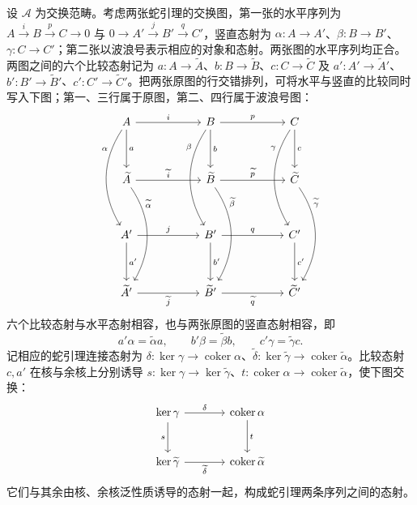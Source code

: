 \begin{proposition}\label{b4:prop:snake-naturality}
	设 \(\mathcal A\) 为交换范畴。考虑两张蛇引理的交换图，第一张的水平序列为 \(A\xrightarrow{i}B\xrightarrow{p}C\to0\) 与 \(0\to A'\xrightarrow{j}B'\xrightarrow{q}C'\)，竖直态射为 \(\alpha:A\to A'\)、\(\beta:B\to B'\)、\(\gamma:C\to C'\)；第二张以波浪号表示相应的对象和态射。两张图的水平序列均正合。两图之间的六个比较态射记为 \(a:A\to\widetilde A\)、\(b:B\to\widetilde B\)、\(c:C\to\widetilde C\) 及 \(a':A'\to\widetilde A'\)、\(b':B'\to\widetilde B'\)、\(c':C'\to\widetilde C'\)。把两张原图的行交错排列，可将水平与竖直的比较同时写入下图；第一、三行属于原图，第二、四行属于波浪号图：
	\[
		\begin{tikzcd}[column sep=5.5em,row sep=3.4em]
			A\arrow[r,"i"]\arrow[d,"a"]\arrow[dd,bend right=32,"\alpha"',pos=0.25]& B\arrow[r,"p"]\arrow[d,"b"]\arrow[dd,bend right=32,"\beta"',pos=0.25]& C\arrow[d,"c"]\arrow[dd,bend right=32,"\gamma"',pos=0.25]\\
			\widetilde A\arrow[r,"\widetilde i"]\arrow[dd,bend left=32,"\widetilde\alpha",pos=0.25]& \widetilde B\arrow[r,"\widetilde p"]\arrow[dd,bend left=32,"\widetilde\beta",pos=0.25]& \widetilde C\arrow[dd,bend left=32,"\widetilde\gamma",pos=0.25]\\
			A'\arrow[r,"j"]\arrow[d,"a'"]&B'\arrow[r,"q"]\arrow[d,"b'"]&C'\arrow[d,"c'"]\\
			\widetilde A'\arrow[r,"\widetilde j"']&\widetilde B'\arrow[r,"\widetilde q"']&\widetilde C'
		\end{tikzcd}
	\]
	六个比较态射与水平态射相容，也与两张原图的竖直态射相容，即
	\[
		a'\alpha=\widetilde\alpha a,\qquad b'\beta=\widetilde\beta b,\qquad c'\gamma=\widetilde\gamma c.
	\]
	记相应的蛇引理连接态射为 \(\delta:\ker\gamma\to\operatorname{coker}\alpha\)、\(\widetilde\delta:\ker\widetilde\gamma\to\operatorname{coker}\widetilde\alpha\)。比较态射 \(c,a'\) 在核与余核上分别诱导 \(s:\ker\gamma\to\ker\widetilde\gamma\)、\(t:\operatorname{coker}\alpha\to\operatorname{coker}\widetilde\alpha\)，使下图交换：
	\[
		\begin{tikzcd}[column sep=large,row sep=large]
			\ker\gamma\arrow[r,"\delta"]\arrow[d,"s"']&\operatorname{coker}\alpha\arrow[d,"t"]\\
			\ker\widetilde\gamma\arrow[r,"\widetilde\delta"']&\operatorname{coker}\widetilde\alpha
		\end{tikzcd}
	\]
	它们与其余由核、余核泛性质诱导的态射一起，构成蛇引理两条序列之间的态射。
\end{proposition}
